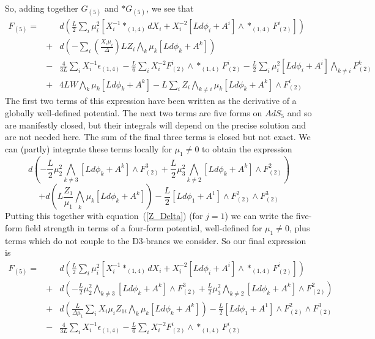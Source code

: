 \documentclass[a4paper,12pt]{article}
\begin{document}
So, adding together $G_{(5)}$ and $*G_{(5)}$, we see that
\begin{eqnarray}
F_{(5)} = & & d \left( \frac{L}{2} \sum_i \mu_i^2 \left[ X_i^{-1} *_{(1,4)} d X_i + X_i^{-2} [Ld\phi_i + A^i] \wedge  *_{(1,4)} F^i_{(2)} \right] \right) \nonumber \\
 & + & d \left( -\sum_i \left( \frac{X_i \mu_i}{\Delta} \right) L Z_i \bigwedge_k \mu_k [L d \phi_k + A^k]\right) \nonumber \\
 & - & \frac{4}{3L} \sum_i X_i^{-1} \epsilon_{(1,4)} - \frac{L}{6}\sum_i X_i^{-2} F^i_{(2)} \wedge  *_{(1,4)} F^i_{(2)} - 
    \frac{L}{2}\sum_i\mu_i^2[Ld\phi_i + A^i] \bigwedge_{k \ne i} F^k_{(2)} \nonumber \\
 & + & 4LW\bigwedge_k \mu_k[Ld\phi_k + A^k] -
        L\sum_i Z_i \bigwedge_{k \ne i} \mu_k[Ld\phi_k + A^k] \wedge F^i_{(2)}
\end{eqnarray}
The first two terms of this expression have been written as the derivative
of a globally well-defined potential. The next two terms are five forms on
$AdS_5$ and so are manifestly closed, but their integrals will depend on the
precise solution and are not needed here. The sum of the final three terms
is closed but not exact. We can (partly) integrate these terms locally for
$\mu_1 \neq 0$ to obtain the expression
$$ d \left( -\frac{L}{2}\mu_2^2 \bigwedge_{k \ne 3} [L d \phi_k + A^k] \wedge F^3_{(2)} +\frac{L}{2}\mu_3^2 \bigwedge_{k \ne 2} [L d \phi_k + A^k] \wedge F^2_{(2)}\right) $$
$$ + d \left( L\frac{Z_1}{\mu_1} \bigwedge_k \mu_k [L d \phi_k + A^k]\right) - \frac{L}{2} [Ld\phi_1 + A^1] \wedge F^2_{(2)} \wedge F^3_{(2)} $$
Putting this together with equation~(\ref{Z_Delta}) (for $j=1$) we can write the five-form
field strength in terms of a four-form potential, well-defined for
$\mu_1 \ne 0$, plus terms which do not couple to the D3-branes we
consider. So our final expression is
\begin{eqnarray}
 F_{(5)} = & & d \left( \frac{L}{2} \sum_i \mu_i^2 \left[ X_i^{-1} *_{(1,4)} d X_i + X_i^{-2} [Ld\phi_i + A^i] \wedge  *_{(1,4)} F^i_{(2)} \right] \right) \nonumber \\
 & + & d \left( -\frac{L}{2}\mu_2^2 \bigwedge_{k \ne 3} [L d \phi_k + A^k] \wedge F^3_{(2)} +\frac{L}{2}\mu_3^2 \bigwedge_{k \ne 2} [L d \phi_k + A^k] \wedge F^2_{(2)}\right) \nonumber \\
 & + & d \left( \frac{L}{\Delta \mu_1}\sum_i X_i \mu_i Z_{1i} \bigwedge_k \mu_k [L d \phi_k + A^k]\right) - \frac{L}{2} [Ld\phi_1 + A^1] \wedge F^2_{(2)} \wedge F^3_{(2)} \nonumber \\
 & - & \frac{4}{3L} \sum_i X_i^{-1} \epsilon_{(1,4)} - \frac{L}{6}\sum_i X_i^{-2} F^i_{(2)} \wedge  *_{(1,4)} F^i_{(2)}
\end{eqnarray}


  
   
   
    
\end{document}
